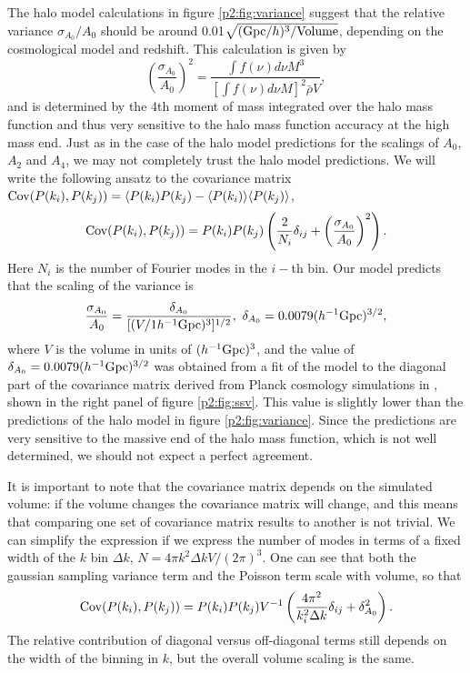 \documentclass[
  11pt,
  twoside,
  openright,
  titlepage,
  headings=optiontoheadandtoc
]{scrbook}
\begin{document}
The halo model calculations in figure \ref{p2:fig:variance} suggest that the relative variance $\sigma_{A_0}/A_0$
should be around 0.01$\sqrt{({\rm Gpc}/h)^3/{\rm Volume}}$, depending on the cosmological model and 
redshift. 
This calculation is given by 
\begin{equation}
\left(\frac{\sigma_{A_0}}{A_0}\right)^2
=\frac{\int f(\nu)d\nu M^3}{[\int f(\nu)d\nu M]^2\bar{\rho} V},
\end{equation}
and is determined by the 4th moment of mass integrated over
the halo mass function and thus very sensitive to the halo mass function 
accuracy at the high mass end. 
Just as in the case of the halo model predictions for the scalings of $A_0$, $A_2$ and 
$A_4$, we may not completely trust the halo model predictions. 
We will write the following ansatz to the 
covariance matrix ${\rm Cov}(P(k_i),P(k_j))=\langle P(k_i)P(k_j)-\langle P(k_i) \rangle \langle P(k_j)\rangle$, 
\begin{equation}
{\rm Cov}(P(k_i),P(k_j))=P(k_i)P(k_j)
\left(\frac{2}{N_i}\delta_{ij}+\left(\frac{\sigma_{A_0}}{A_0}\right)^2\right).
\label{p2:cov}
\end{equation}
Here $N_i$ is the number of Fourier modes in the $i-$th bin. Our model predicts that the scaling of the variance is
\begin{equation}
\frac{\sigma_{A_0}}{A_0}
=\frac{\delta_{A_0}}{[(V/1 h^{-1} {\rm Gpc})^3]^{1/2}},
\,\, \delta_{A_0}=0.0079({h^{-1} {\rm Gpc})^{3/2}},
\label{p2:sigaa}
\end{equation}
where $V$ is the volume in units of $(h^{-1} {\rm Gpc})^3$, and the value of $\delta_{A_0}=0.0079({h^{-1} {\rm Gpc})^{3/2}}$
was obtained from a
fit of the model to the diagonal part of the covariance matrix derived from Planck cosmology
simulations in \cite{2014PhRvD..89h3519L}, shown in the right panel of figure \ref{p2:fig:ssv}. 
This value is slightly lower than 
the predictions of the halo model in figure \ref{p2:fig:variance}. Since the predictions are 
very sensitive to the massive end of the halo mass function, which is not well determined, we should not expect a perfect
agreement. 

It is important to note that the covariance matrix depends on the simulated volume: if the volume changes the 
covariance matrix will change, and this means that comparing one set of covariance matrix results to another is 
not trivial. We can simplify the expression if we express the number of modes in terms of a fixed width of the 
$k$ bin $\Delta k$, $N=4\pi k^2\Delta k V/(2\pi)^3$. One can see that both
the gaussian sampling variance term and the Poisson term scale with volume, so that 
\begin{equation}
{\rm Cov}(P(k_i),P(k_j))=P(k_i)P(k_j)V^{-1}
\left(\frac{4\pi^2}{k_i^2\Delta k}\delta_{ij}+\delta_{A_0}^2\right).
\label{p2:cov1}
\end{equation}
The relative contribution of diagonal versus off-diagonal terms still depends on the width of the binning in $k$, 
but the overall volume scaling is the same. 
\end{document}
